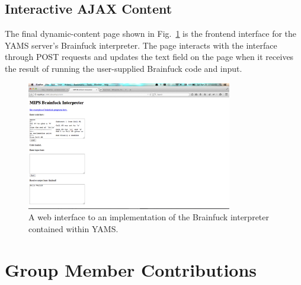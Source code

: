\documentclass[journal,10pt]{IEEEtran}
\begin{document}
\subsection{Interactive AJAX Content}

The final dynamic-content page shown in Fig.~\ref{fig:interactive_ajax} is the frontend interface for the YAMS server's Brainfuck\cite{Mpreu/preller} interpreter. The page interacts with the interface through POST requests and updates the text field on the page when it receives the result of running the user-supplied Brainfuck code and input.

\begin{figure}[!t]
\centering
\includegraphics[width=0.8\textwidth,natwidth=1440,natheight=900]{interactive_ajax}
\caption{A web interface to an implementation of the Brainfuck interpreter contained within YAMS.}
\label{fig:interactive_ajax}
\end{figure}

\section{Group Member Contributions}
\end{document}
